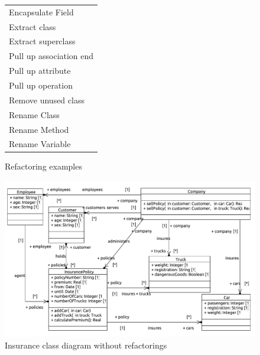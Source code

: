 \documentclass{llncs}
\begin{document}
\begin{figure}[h!t]
 \centering
 \begin{tabular}[]{l}
  \hline
  Encapsulate Field\\
  Extract class\\
  Extract superclass\\
  Pull up association end\\
  Pull up attribute\\
  Pull up operation\\
  Remove unused class\\
  Rename Class\\
  Rename Method\\
  Rename Variable\\
  \hline
 \end{tabular}
 \caption{Refactoring examples}
 \label{fig:refactoringlist}
\end{figure}

\begin{figure}[h!t]
 \centering
 \includegraphics[scale=0.5]{images/insurance/Model_Model_ClassDiagram.PDF}
 \caption{Insurance class diagram without refactorings}
 \label{fig:classdiagramcomplex}
\end{figure}
\end{document}
